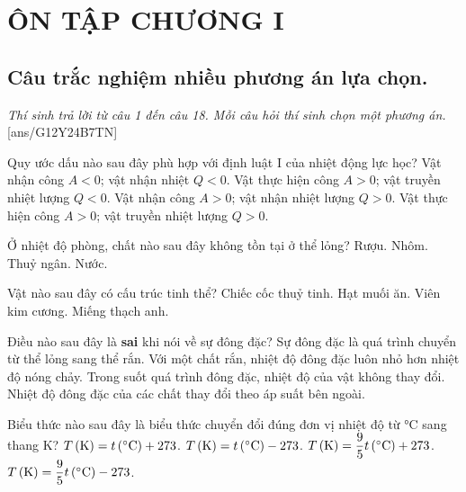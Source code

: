 \section*{ÔN TẬP CHƯƠNG I}
\subsection{Câu trắc nghiệm nhiều phương án lựa chọn.}
\textit{Thí sinh trả lời từ câu 1 đến câu 18. Mỗi câu hỏi thí sinh chọn một phương án.}
[ans/G12Y24B7TN]
\begin{ex}
	Quy ước dấu nào sau đây phù hợp với định luật I của nhiệt động lực học?
	\choice
	{Vật nhận công $A<0$; vật nhận nhiệt $Q<0$.}
	{Vật thực hiện công $A>0$; vật truyền nhiệt lượng $Q<0$.}
	{\True Vật nhận công $A>0$; vật nhận nhiệt lượng $Q>0$.}
	{Vật thực hiện công $A>0$; vật truyền nhiệt lượng $Q>0$.}
	\loigiai{}
\end{ex}
\begin{ex}
	Ở nhiệt độ phòng, chất nào sau đây không tồn tại ở thể lỏng?
	\choice
	{Rượu.}
	{\True Nhôm.}
	{Thuỷ ngân.}
	{Nước.}
	\loigiai{}
\end{ex}
\begin{ex}
	Vật nào sau đây có cấu trúc tinh thể?
	\choice
	{\True Chiếc cốc thuỷ tinh.}
	{Hạt muối ăn.}
	{Viên kim cương.}
	{Miếng thạch anh.}
	\loigiai{}
\end{ex}
\begin{ex}
Điều nào sau đây là \textbf{sai} khi nói về sự đông đặc?	
	\choice
	{Sự đông đặc là quá trình chuyển từ thể lỏng sang thể rắn.}
	{\True Với một chất rắn, nhiệt độ đông đặc luôn nhỏ hơn nhiệt độ nóng chảy.}
	{Trong suốt quá trình đông đặc, nhiệt độ của vật không thay đổi.}
	{Nhiệt độ đông đặc của các chất thay đổi theo áp suất bên ngoài.}
	\loigiai{}
\end{ex}
\begin{ex}
	Biểu thức nào sau đây là biểu thức chuyển đổi đúng đơn vị nhiệt độ từ $\si{\celsius}$ sang thang $\si{\kelvin}$?
	\choice
	{\True $\xsi{T}{\left(\si{\kelvin}\right)}=\xsi{t}{\left(\si{\celsius}\right)}+273$.}
	{$\xsi{T}{\left(\si{\kelvin}\right)}=\xsi{t}{\left(\si{\celsius}\right)}-273$.}
	{$\xsi{T}{\left(\si{\kelvin}\right)}=\dfrac{9}{5}\xsi{t}{\left(\si{\celsius}\right)}+273$.}
	{$\xsi{T}{\left(\si{\kelvin}\right)}=\dfrac{9}{5}\xsi{t}{\left(\si{\celsius}\right)}-273$.}
	\loigiai{}
\end{ex}
